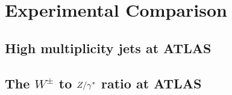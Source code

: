 \chapter{Experimental Comparison}

\section{High multiplicity jets at ATLAS}

\section{The $W^\pm$ to ${Z/\gamma^*}$ ratio at ATLAS}

